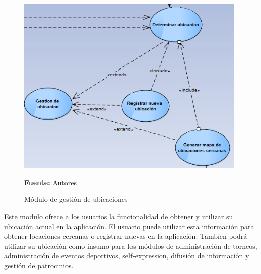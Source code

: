 \begin{figure}[!htb]
  \begin{center}
    \includegraphics[width=11cm]{./imagenes/casos_uso/gestion_localizacion.png}
    \caption{Módulo de gestión de ubicaciones}
    \label{fig:cu_localizacion}
    \textbf{Fuente:} Autores
  \end{center}
\end{figure}

Este modulo ofrece a los usuarios la funcionalidad de obtener y utilizar su ubicación actual en la aplicación. El usuario puede utilizar esta información para obtener locaciones cercanas o registrar nuevas en la aplicación. Tambíen podrá utilizar su ubicación como insumo para los módulos de administración de torneos, administración de eventos deportivos, self-expression, difusión de información y gestión de patrocinios.